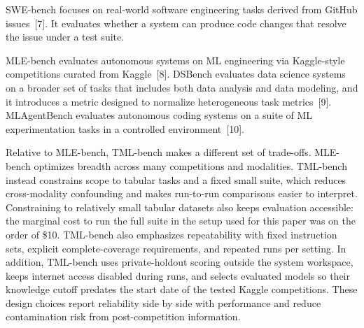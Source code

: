 SWE-bench focuses on real-world software engineering tasks derived from GitHub issues~[7]. It evaluates whether a system can produce code changes that resolve the issue under a test suite.

MLE-bench evaluates autonomous systems on ML engineering via Kaggle-style competitions curated from Kaggle~[8]. DSBench evaluates data science systems on a broader set of tasks that includes both data analysis and data modeling, and it introduces a metric designed to normalize heterogeneous task metrics~[9]. MLAgentBench evaluates autonomous coding systems on a suite of ML experimentation tasks in a controlled environment~[10].

Relative to MLE-bench, TML-bench makes a different set of trade-offs. MLE-bench optimizes breadth across many competitions and modalities. TML-bench instead constrains scope to tabular tasks and a fixed small suite, which reduces cross-modality confounding and makes run-to-run comparisons easier to interpret. Constraining to relatively small tabular datasets also keeps evaluation accessible: the marginal cost to run the full suite in the setup used for this paper was on the order of \$10. TML-bench also emphasizes repeatability with fixed instruction sets, explicit complete-coverage requirements, and repeated runs per setting. In addition, TML-bench uses private-holdout scoring outside the system workspace, keeps internet access disabled during runs, and selects evaluated models so their knowledge cutoff predates the start date of the tested Kaggle competitions. These design choices report reliability side by side with performance and reduce contamination risk from post-competition information.
